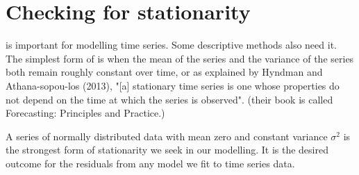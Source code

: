 \section{Checking for stationarity}\label{Stationarity}  
 
 is important for modelling time series. Some descriptive methods also need it. 
The simplest form of  is when the mean of the series and the variance of the series both remain roughly constant over time, or as explained by Hyndman and Athana-sopou-los (2013), "[a] stationary time series is one whose properties do not depend on the time at which the series is observed". (their book is called Forecasting: Principles and Practice.) 
  
A  series of normally distributed data with mean zero and constant variance $\sigma^2$ is the strongest form of stationarity we seek in our modelling. It is the desired outcome for the residuals from any model we fit to time series data. 
 
